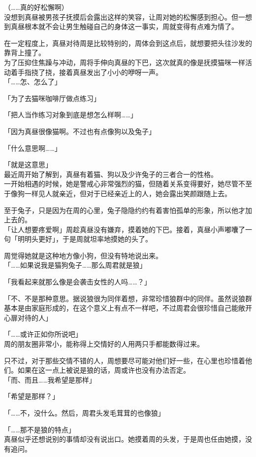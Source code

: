 （……真的好松懈啊）\\

没想到真昼被男孩子抚摸后会露出这样的笑容，让周对她的松懈感到担心。但一想到真昼根本就不会让男生触碰自己的身体这一事实，周就变得有点难为情了。

在一定程度上，真昼对待周是比较特别的，周体会到这点后，就想要把头往沙发的靠背上撞了。\\

为了压抑住焦躁与冲动，周将手伸向真昼的下巴，这次就真的像是抚摸猫咪一样活动着手指挠了挠，接着真昼发出了小小的咿呀一声。\\

「……怎、怎么了」

「为了去猫咪咖啡厅做点练习」

「把人当作练习对象到底是想怎么样啊……」

「因为真昼很像猫啊。不过也有点像狗以及兔子」

「什么意思啊……」

「就是这意思」\\

最近周开始了解到，真昼有着猫、狗以及少许兔子的三者合一的性格。\\

一开始相遇的时候，她是警戒心非常强烈的猫，但随着关系变得要好，她尽管不至于像狗一样见人就亲近，但对于已经亲近上的人，她会露出笑颜跟随上去。

至于兔子，只是因为在周的心里，兔子隐隐约约有着害怕孤单的形象，所以他才加上去的。\\

「让人想要疼爱啊」周趁真昼没有嫌弃，摸着她的下巴。接着，真昼小声嘟囔了一句「明明头更好」，于是周就坦率地摸她的头了。

周觉得她就是这种地方像小狗，但没有特地说出来。\\

「……如果说我是猫狗兔子……那么周君就是狼」

「我看起来就那么像是会袭击女性的人吗……？」

「不、不是那种意思。据说狼很为同伴着想，非常珍惜狼群中的同伴。虽然说狼群基本是由家庭形成的，在这个意义上有点不一样吧，不过周君会很珍惜自己能敞开心扉对待的人」

「……或许正如你所说吧」\\

周的朋友圈非常小，能称得上交情好的人用两只手都能数得过来。

只不过，对于那些交情不错的人，周想要尽可能对他们好一些，在心里也珍惜着他们。如果在这一点上被说是狼的话，周或许也没有办法否定。\\

「而、而且……我希望是那样」

「希望是那样？」

「……不，没什么。然后，周君头发毛茸茸的也像狼」

「……那不是狼的特点」\\

真昼似乎还想说别的事情却没有说出口。她摸着周的头发，于是周也任由她摸，没有追问。
